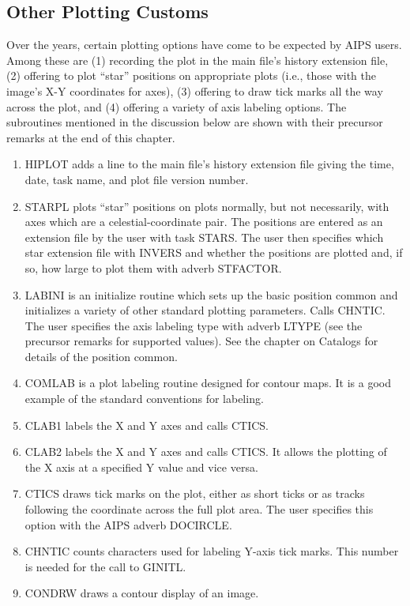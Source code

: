 \subsection{Other Plotting Customs}
Over the years, certain plotting options have come to be expected by
AIPS users.  Among these are (1) recording the plot in the main file's
history extension file, (2) offering to plot ``star'' positions on
appropriate plots (i.e., those with the image's X-Y coordinates for
axes), (3) offering to draw tick marks all the way across the plot,
and (4) offering a variety of axis labeling options.  The subroutines
mentioned in the discussion below are shown with their precursor
remarks at the end of this chapter.

\begin{enumerate} %
\item HIPLOT adds a line to the main file's history
extension file giving the time, date, task name, and plot file version
number.
\item STARPL plots ``star'' positions on plots normally,
but not necessarily, with axes which are a celestial-coordinate pair.
The positions are entered as an extension file by the user with task
STARS.  The user then specifies which star extension file with INVERS
and whether the positions are plotted and, if so, how large to plot
them with adverb STFACTOR.
\item LABINI is an initialize routine which sets up the
basic position common and initializes a variety of other standard plotting
parameters. Calls CHNTIC.  The user specifies the axis labeling type
with adverb LTYPE (see the precursor remarks for supported values).
See the chapter on Catalogs for details of the position common.
\item COMLAB is a plot labeling routine designed for
contour maps.  It is a good example of the standard conventions for
labeling.
\item CLAB1 labels the X and Y axes and calls CTICS.
\item CLAB2 labels the X and Y axes and calls CTICS.  It
allows the plotting of the X axis at a specified Y value and vice versa.
\item CTICS draws tick marks on the plot, either as short
ticks or as tracks following the coordinate across the full plot area.
The user specifies this option with the AIPS adverb DOCIRCLE.
\item CHNTIC counts characters used for labeling Y-axis
tick marks.  This number is needed for the call to GINITL.
\item CONDRW draws a contour display of an image.

\end{enumerate} %
